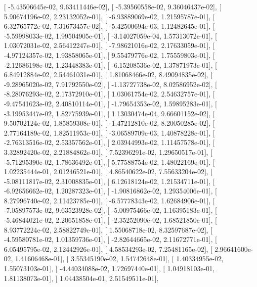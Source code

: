 \documentclass{article}
\begin{document}
       [ -5.43506645e-02,   9.63411446e-02],
       [ -5.39560558e-02,   9.36046437e-02],
       [  5.90674196e-02,   2.23132052e-01],
       [ -6.93889069e-02,   1.21595787e-01],
       [  6.32765772e-02,   7.31673457e-02],
       [ -5.42500694e-03,   1.12482645e-01],
       [ -5.59998033e-02,   1.99504905e-01],
       [ -3.14027059e-04,   1.57313072e-01],
       [  1.03072031e-02,   2.56412247e-01],
       [ -7.98621016e-02,   2.17633059e-01],
       [ -4.97124357e-02,   1.93858065e-01],
       [  9.55479776e-02,   1.75559803e-01],
       [ -2.12686198e-02,   1.23448383e-01],
       [ -6.15208536e-02,   1.37871973e-01],
       [  6.84912884e-02,   2.54461031e-01],
       [  1.81068466e-02,   8.49094835e-02],
       [ -9.28965020e-02,   7.91792550e-02],
       [ -1.13727738e-02,   8.02586952e-02],
       [ -8.28076293e-02,   2.17372910e-01],
       [  1.03061754e-02,   2.54632757e-01],
       [ -9.47541623e-02,   2.40810114e-01],
       [ -1.79654353e-02,   1.59895283e-01],
       [ -3.19953447e-02,   1.82775939e-01],
       [  1.13030474e-04,   9.66601152e-02],
       [  9.50702124e-02,   1.85859308e-01],
       [ -1.47212810e-02,   8.20050285e-02],
       [  2.77164189e-02,   1.82511953e-01],
       [ -3.06589709e-03,   1.40878228e-01],
       [ -2.76313516e-02,   2.53357562e-01],
       [  2.03944993e-02,   1.11457578e-01],
       [  3.32892420e-02,   2.21884862e-01],
       [  7.52396291e-02,   1.29650517e-01],
       [ -5.71295390e-02,   1.78636492e-01],
       [  5.77588754e-02,   1.48022169e-01],
       [  1.02235444e-01,   2.01246521e-01],
       [  4.86540622e-02,   7.55633204e-02],
       [ -5.08111817e-02,   2.31008835e-01],
       [  6.12618124e-02,   1.21534711e-01],
       [ -6.92656662e-02,   1.20287323e-01],
       [ -1.90816862e-02,   1.29354006e-01],
       [  8.27996740e-02,   2.11423785e-01],
       [ -6.57778343e-02,   1.62684906e-01],
       [ -7.05897573e-02,   9.63523928e-02],
       [ -5.00975466e-02,   1.16395183e-01],
       [ -5.46844021e-02,   2.20651858e-01],
       [ -2.35252090e-02,   1.68521850e-01],
       [  8.93772224e-02,   2.58822749e-01],
       [  1.55068718e-02,   8.32597687e-02],
       [ -4.59580781e-02,   1.01359736e-01],
       [ -2.82644665e-02,   2.11672771e-01],
       [  6.05495795e-02,   2.12442926e-01],
       [  4.58534293e-02,   7.25481165e-02],
       [  2.96641600e-02,   1.41606468e-01],
       [  3.55345190e-02,   1.54742648e-01],
       [  1.40334955e-02,   1.55073103e-01],
       [ -4.44034088e-02,   1.72697440e-01],
       [  1.04918103e-01,   1.81138073e-01],
       [  1.04438504e-01,   2.51549511e-01],
\end{document}
